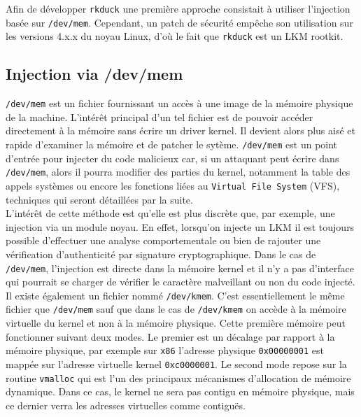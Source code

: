 \documentclass[12pt]{article}
\begin{document}
    Afin de développer \texttt{rkduck} une première approche consistait à utiliser l'injection basée sur \texttt{/dev/mem}. Cependant, un patch de sécurité empêche son utilisation sur les versions 4.x.x du noyau Linux, d'où le fait que \texttt{rkduck} est un LKM rootkit.

    \subsection{Injection via /dev/mem}
    
        \texttt{/dev/mem} est un fichier fournissant un accès à une image de la mémoire physique de la machine. L'intérêt principal d'un tel fichier est de pouvoir accéder directement à la mémoire sans écrire un driver kernel. Il devient alors plus aisé et rapide d'examiner la mémoire et de patcher le sytème. \texttt{/dev/mem} est un point d'entrée pour injecter du code malicieux\cite{hackin9}\cite{sstic} car, si un attaquant peut écrire dans \texttt{/dev/mem}, alors il pourra modifier des parties du kernel, notamment la table des appels systèmes ou encore les fonctions liées au \texttt{Virtual File System} (VFS), techniques qui seront détaillées par la suite.\\
        
        L'intérêt de cette méthode est qu'elle est plus discrète que, par exemple, une injection via un module noyau. En effet, lorsqu'on injecte un LKM il est toujours possible d'effectuer une analyse comportementale ou bien de rajouter une vérification d'authenticité par signature cryptographique. Dans le cas de \texttt{/dev/mem}, l'injection est directe dans la mémoire kernel et il n'y a pas d'interface qui pourrait se charger de vérifier le caractère malveillant ou non du code injecté.\\
        
        Il existe également un fichier nommé \texttt{/dev/kmem}\cite{devkmem}. C'est essentiellement le même fichier que \texttt{/dev/mem} sauf que dans le cas de \texttt{/dev/kmem} on accède à la mémoire virtuelle du kernel et non à la mémoire physique. Cette première mémoire peut fonctionner suivant deux modes. Le premier est un décalage par rapport à la mémoire physique, par exemple sur \texttt{x86} l'adresse physique \texttt{0x00000001} est mappée sur l'adresse virtuelle kernel \texttt{0xc0000001}. Le second mode repose sur la routine \texttt{vmalloc} qui est l'un des principaux mécanismes d'allocation de mémoire dynamique. Dans ce cas, le kernel ne sera pas contigu en mémoire physique, mais ce dernier verra les adresses virtuelles comme contiguës.\\
        
\end{document}
